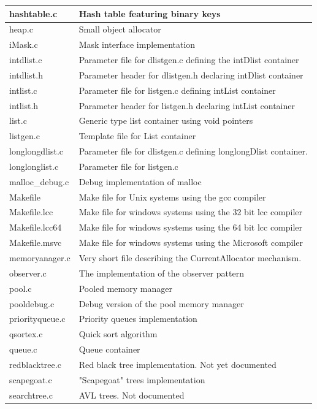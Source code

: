 \documentclass[12pt,a4paper]{memoir} %
\begin{document}
{{{\begin{longtable}{||p{3.5cm}|p{11cm}||}
hashtable.c&Hash table featuring binary keys\\\hline
heap.c&Small object allocator\\\hline
iMask.c&Mask interface implementation\\\hline
intdlist.c&Parameter file for dlistgen.c defining the intDlist container\\\hline
intdlist.h&Parameter header for dlistgen.h declaring intDlist container\\\hline
intlist.c&Parameter file for listgen.c defining intList container\\\hline
intlist.h&Parameter header for listgen.h declaring intList container\\\hline
list.c&Generic type list container using void pointers\\\hline
listgen.c&Template file for List container\\\hline
longlongdlist.c&Parameter file for dlistgen.c defining longlongDlist container.\\\hline
longlonglist.c&Parameter file for listgen.c\\\hline
malloc\_debug.c&Debug implementation of malloc\\\hline
Makefile&Make file for Unix systems using the gcc compiler\\\hline
Makefile.lcc&Make file for windows systems using the 32 bit lcc compiler\\\hline
Makefile.lcc64&Make file for windows systems using the 64 bit lcc compiler\\\hline
Makefile.msvc&Make file for windows systems using the Microsoft compiler\\\hline
memoryanager.c&Very short file describing the CurrentAllocator mechanism.\\\hline
observer.c&The implementation of the observer pattern\\\hline
pool.c&Pooled memory manager\\\hline
pooldebug.c&Debug version of the pool memory manager\\\hline
priorityqueue.c&Priority queues implementation\\\hline
qsortex.c&Quick sort algorithm\\\hline
queue.c&Queue container\\\hline
redblacktree.c&Red black tree implementation. Not yet documented\\\hline
scapegoat.c&"Scapegoat" trees implementation\\\hline
searchtree.c&AVL trees. Not documented\\\hline

\end{longtable}}}}
\end{document}
